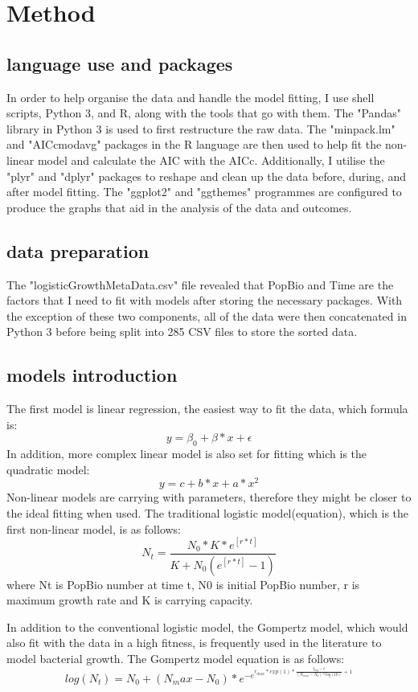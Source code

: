 \documentclass[11pt]{article}
\begin{document}
\section{Method}

\subsection{language use and packages}
In order to help organise the data and handle the model fitting, I use shell scripts, Python 3, and R, along with the tools that go with them. The "Pandas" library in Python 3 is used to first restructure the raw data. The "minpack.lm" and "AICcmodavg" packages in the R language are then used to help fit the non-linear model and calculate the AIC with the AICc. Additionally, I utilise the "plyr" and "dplyr" packages to reshape and clean up the data before, during, and after model fitting. The "ggplot2" and "ggthemes" programmes are configured to produce the graphs that aid in the analysis of the data and outcomes.

\subsection{data preparation}
The "logisticGrowthMetaData.csv" file revealed that PopBio and Time are the factors that I need to fit with models after storing the necessary packages. With the exception of these two components, all of the data were then concatenated in Python 3 before being split into 285 CSV files to store the sorted data.

\subsection{models introduction}
The first model is linear regression, the easiest way to fit the data, which formula is: 
$$
y = \beta_0 + \beta * x + \epsilon
$$
In addition, more complex linear model is also set for fitting which is the quadratic model:
$$
y = c + b *x + a* x^2
$$
Non-linear models are carrying with parameters, therefore they might be closer to the ideal fitting when used. The traditional logistic model(equation), which is the first non-linear model, is as follows:
$$
N_t= \frac{N_0 *K * e^[r*t]}{K + N_0(e^[r*t] -1)}
$$
where Nt is PopBio number at time t, N0 is initial PopBio number, r is maximum growth rate and K is carrying capacity.

In addition to the conventional logistic model, the Gompertz model, which would also fit with the data in a high fitness, is frequently used in the literature to model bacterial growth. The Gompertz model equation is as follows:
$$
log(N_t)=N_0 +(N_max-N_0)*e^{{-e}^{{r_{max}* exp(1) *{\frac{t_{lag}-t}{(N_{max}-N_0)*log(10)}+1}}}}
$$
\end{document}
